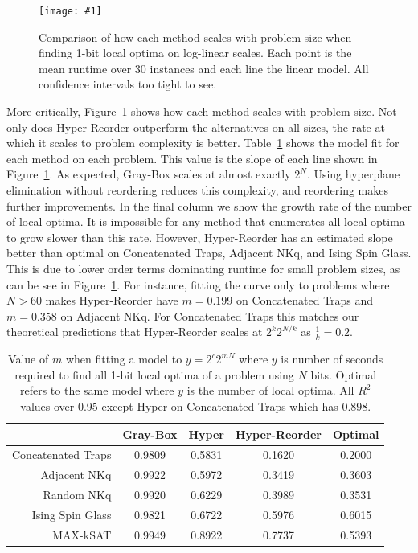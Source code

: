 \documentclass[runningheads,a4paper]{llncs}
\newcommand{\includegraphicsfit}[1]
{\texttt{[image: \#1]}}
\begin{document}
\begin{figure}
  \centering
  \includegraphicsfit{length-method}
  \caption{Comparison of how each method scales with problem size when finding 1-bit local optima
           on log-linear scales. Each point is the mean
           runtime over 30 instances and each line the linear model. All confidence intervals too tight to see.}
  \label{fig-length-method}
\end{figure}


More critically, Figure~\ref{fig-length-method} shows how each method scales with problem size.
Not only does Hyper-Reorder outperform the alternatives on all sizes, the rate at which it
scales to problem complexity is better. Table~\ref{table-scaling} shows the model fit for each
method on each problem. This value is the slope of each line shown in Figure~\ref{fig-length-method}.
As expected, Gray-Box scales at almost exactly $2^N$. Using hyperplane elimination without
reordering reduces this complexity, and reordering makes further improvements. In the final
column we show the growth rate of the number of local optima. It is impossible for any method
that enumerates all local optima to grow slower than this rate.
However, Hyper-Reorder has an estimated slope better than optimal on Concatenated Traps, Adjacent
NKq, and Ising Spin Glass.
This is
due to lower order terms dominating runtime for small problem sizes, as can be see in
Figure~\ref{fig-length-method}. For instance, fitting
the curve only to problems where $N>60$ makes Hyper-Reorder have $m=0.199$ on Concatenated Traps and
$m=0.358$ on Adjacent NKq. For Concatenated Traps this matches our theoretical predictions that
Hyper-Reorder scales at $2^k2^{N/k}$ as $\frac{1}{k}=0.2$.

\begin{table}
	\centering
	\caption{Value of $m$ when fitting a model to $y = 2^c2^{mN}$ where $y$ is number of seconds required to
	         find all 1-bit local optima of a problem using $N$ bits. Optimal refers to the same model where
	         $y$ is the number of local optima. All $R^2$ values over 0.95 except Hyper on Concatenated Traps
	         which has 0.898.}
	\begin{tabular}{|r|c|c|c|c|}
	  \hline
	    & \textbf{Gray-Box} & \textbf{Hyper} & \textbf{Hyper-Reorder} & \textbf{Optimal} \\ \hline
    Concatenated Traps & 0.9809 & 0.5831 & 0.1620 & 0.2000 \\ \hline
    Adjacent NKq & 0.9922 & 0.5972 & 0.3419 & 0.3603 \\ \hline
    Random NKq & 0.9920 & 0.6229 & 0.3989 & 0.3531 \\ \hline
    Ising Spin Glass & 0.9821 & 0.6722 & 0.5976 & 0.6015 \\ \hline
    MAX-kSAT & 0.9949 & 0.8922 & 0.7737 & 0.5393 \\ \hline
  \end{tabular}
  \label{table-scaling}
\end{table}
\end{document}

